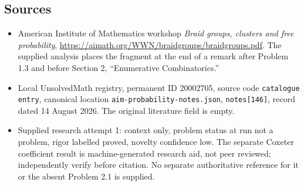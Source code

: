 \documentclass[11pt]{article}
\begin{document}
\subsection{Sources}
\begin{itemize}
\item American Institute of Mathematics workshop \emph{Braid groups, clusters and free probability}, \url{https://aimath.org/WWN/braidgroups/braidgroups.pdf}. The supplied analysis places the fragment at the end of a remark after Problem 1.3 and before Section 2, ``Enumerative Combinatorics.''
\item Local UnsolvedMath registry, permanent ID 20002705, source code \texttt{catalogue entry}, canonical location \texttt{aim-probability-notes.json}, \texttt{notes[146]}, record dated 14 August 2026. The original literature field is empty.
\item Supplied research attempt 1: context only, problem status at run not a problem, rigor labelled proved, novelty confidence low. The separate Coxeter coefficient result is machine-generated research aid, not peer reviewed; independently verify before citation. No separate authoritative reference for it or the absent Problem 2.1 is supplied.
\end{itemize}
\end{document}
